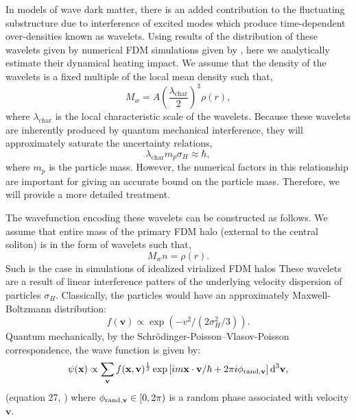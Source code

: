 \documentclass[usenatbib]{mnras}
\begin{document}
In models of wave dark matter, there is an added contribution to the fluctuating substructure due to interference of excited modes which produce time-dependent over-densities known as wavelets. Using results of the distribution of these wavelets given by numerical FDM simulations given by \cite{BECDM}, here we analytically estimate their dynamical heating impact. We assume that the density of the wavelets is a fixed multiple of the local mean density such that,
\begin{equation} \label{multiple_of_background}
M_w = A \left(\frac{\lambda_{\text{char}}}{2} \right)^3 \rho(r),
\end{equation}  
where $\lambda_{\text{char}}$ is the local characteristic scale of the wavelets. Because these wavelets are inherently produced by quantum mechanical interference, they will approximately saturate the uncertainty relations,
\begin{equation}
\lambda_{\text{char}} m_p \sigma_H \approx \hbar,
\end{equation}
where $m_p$ is the particle mass. However, the numerical factors in this relationship are important for giving an accurate bound on the particle mass. Therefore, we will provide a more detailed treatment. 
\par
The wavefunction encoding these wavelets can be constructed as follows. We assume that entire mass of the primary FDM halo (external to the central soliton) is in the form of wavelets such that,
\begin{equation} \label{const}
M_w n = \rho(r).
\end{equation}
Such is the case in simulations of idealized virialized FDM halos \citep{numerical-Schrodinger} These wavelets are a result of linear interference patters of the underlying velocity dispersion of particles $\sigma_H$. Classically, the particles would have an approximately Maxwell-Boltzmann distribution:
\begin{equation}
f(\mathbf{v}) \propto \exp\left(-v^2/(2\sigma_{H}^2/3)\right).
\end{equation}
Quantum mechanically, by the Schr\"{o}dinger-Poisson–Vlasov-Poisson correspondence, the wave function is given by:
\begin{equation} \label{phase_dist}
\psi(\mathbf{x}) \propto \sum_{\mathbf{v}} f(\mathbf{x},\mathbf{v})^{\frac{1}{2}} \exp{\left[i m \mathbf{x}\cdot\mathbf{v}/\hbar + 2\pi i \phi_{{\rm rand},\mathbf{v}} \right]}
\, \mathrm{d}^{3}{\mathbf{v}},
\end{equation}
(equation 27, \cite{Schrodinger-Poisson}) where $\phi_{{\rm rand},\mathbf{v}}\in[0,2\pi)$ is a random phase associated with velocity $\mathbf{v}$.
\end{document}
